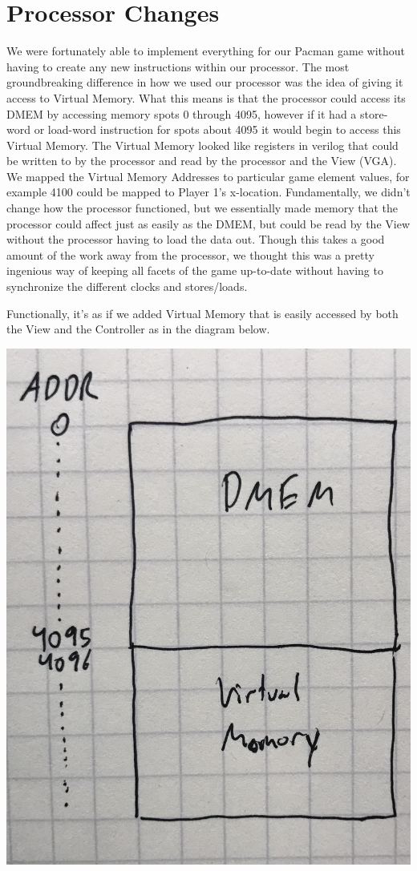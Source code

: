 \documentclass[letterpaper]{article} %
\begin{document}
\section{Processor Changes}
	We were fortunately able to implement everything for our Pacman game without having to create any new instructions within our processor. The most groundbreaking difference in how we used our processor was the idea of giving it access to Virtual Memory. What this means is that the processor could access its DMEM by accessing memory spots 0 through 4095, however if it had a store-word or load-word instruction for spots about 4095 it would begin to access this Virtual Memory. The Virtual Memory looked like registers in verilog that could be written to by the processor and read by the processor and the View (VGA). We mapped the Virtual Memory Addresses to particular game element values, for example 4100 could be mapped to Player 1's x-location. Fundamentally, we didn't change how the processor functioned, but we essentially made memory that the processor could affect just as easily as the DMEM, but could be read by the View without the processor having to load the data out. Though this takes a good amount of the work away from the processor, we thought this was a pretty ingenious way of keeping all facets of the game up-to-date without having to synchronize the different clocks and stores/loads. \par
	Functionally, it's as if we added Virtual Memory that is easily accessed by both the View and the Controller as in the diagram below. \par
	\begin{center}
		\includegraphics[scale=.05]{virtual_mem}
	\end{center}\par
\end{document}
